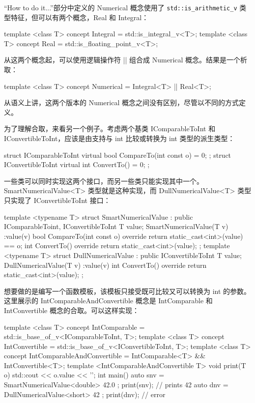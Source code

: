 “How to do it...”部分中定义的 Numerical 概念使用了 \verb|std::is_arithmetic_v| 类型特征，但可以有两个概念，Real 和 Integral：

\begin{cpp}
template <class T>
concept Integral = std::is_integral_v<T>;
template <class T>
concept Real = std::is_floating_point_v<T>;
\end{cpp}

从这两个概念起，可以使用逻辑操作符 || 组合成 Numerical 概念。结果是一个析取：

\begin{cpp}
template <class T>
concept Numerical = Integral<T> || Real<T>;
\end{cpp}

从语义上讲，这两个版本的 Numerical 概念之间没有区别，尽管以不同的方式定义。

为了理解合取，来看另一个例子。考虑两个基类 IComparableToInt 和 IConvertibleToInt，应该是由支持与 int 比较或转换为 int 类型的派生类型：

\begin{cpp}
struct IComparableToInt
{
    virtual bool CompareTo(int const o) = 0;
};
struct IConvertibleToInt
{
    virtual int ConvertTo() = 0;
};
\end{cpp}

一些类可以同时实现这两个接口，而另一些类只能实现其中一个。SmartNumericalValue<T> 类型就是这种实现，而 DullNumericalValue<T> 类型只实现了 IConvertibleToInt 接口：

\begin{cpp}
template <typename T>
struct SmartNumericalValue : public IComparableToint, IConvertibleToInt
{
    T value;
    SmartNumericalValue(T v) :value(v) {}
    bool CompareTo(int const o) override
    { return static_cast<int>(value) == o; }
    int ConvertTo() override
    { return static_cast<int>(value); }
};
template <typename T>
struct DullNumericalValue : public IConvertibleToInt
{
    T value;
    DullNumericalValue(T v) :value(v) {}
    int ConvertTo() override
    { return static_cast<int>(value); }
};
\end{cpp}

想要做的是编写一个函数模板，该模板只接受既可比较又可以转换为 int 的参数。这里展示的 IntComparableAndConvertible 概念是 IntComparable 和 IntConvertible 概念的合取。可以这样实现：

\begin{cpp}
template <class T>
concept IntComparable = std::is_base_of_v<IComparableToInt, T>;
template <class T>
concept IntConvertible = std::is_base_of_v<IConvertibleToInt, T>;
template <class T>
concept IntComparableAndConvertible = IntComparable<T> && IntConvertible<T>;
template <IntComparableAndConvertible T>
void print(T o)
{
    std::cout << o.value << '\n';
}
int main()
{
    auto snv = SmartNumericalValue<double>{ 42.0 };
    print(snv);                      // prints 42
    auto dnv = DullNumericalValue<short>{ 42 };
    print(dnv);                      // error
}
\end{cpp}


